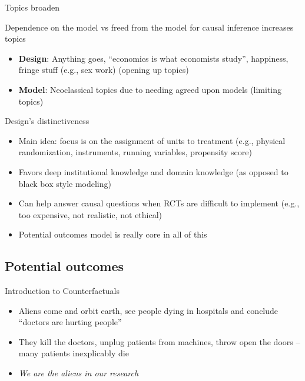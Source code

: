 \documentclass{beamer}
\begin{document}
\begin{frame}{Topics broaden}

  Dependence on the model vs freed from the model for causal inference increases topics
  \begin{itemize}
    \item \textbf{Design}: Anything goes, ``economics is what economists study'', happiness, fringe stuff (e.g., sex work) (opening up topics)
    \item \textbf{Model}: Neoclassical topics due to needing agreed upon models (limiting topics)
  \end{itemize}

\end{frame}


\begin{frame}{Design's distinctiveness}

  \begin{itemize}
    \item Main idea: focus is on the assignment of units to treatment (e.g., physical randomization, instruments, running variables, propensity score)
    \item Favors deep institutional knowledge and domain knowledge (as opposed to black box style modeling)
    \item Can help answer causal questions when RCTs are difficult to implement (e.g., too expensive, not realistic, not ethical)
    \item Potential outcomes model is really core in all of this
  \end{itemize}

\end{frame}

\subsection{Potential outcomes}

\begin{frame}{Introduction to Counterfactuals}

  \begin{itemize}
    \item Aliens come and orbit earth, see people dying in hospitals and conclude ``doctors are hurting people''
    \item They kill the doctors, unplug patients from machines, throw open the doors -- many patients inexplicably die
    \item \emph{We are the aliens in our research}
  \end{itemize}

\end{frame}
\end{document}
